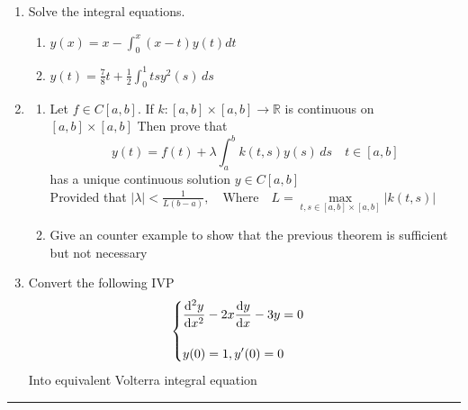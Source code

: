 \documentclass[]{article}
\begin{document}
\begin{enumerate}
    \item Solve the integral equations.
          \vspace*{.2cm}
          \begin{enumerate}
              \item $\displaystyle  y(x)=x-\int_{0}^{x} (x-t) y(t)dt $
              \vspace*{.1cm}
              \item  $\displaystyle y(t)=\frac{7}{8}t+\frac{1}{2} \int_0^1 ts y^2(s) \,ds$
          \end{enumerate}
          \vspace*{.4cm}
    \item

          \begin{enumerate}
              \item Let $\displaystyle f \in C[a,b]$. If $k:[a,b]\times[a,b] \rightarrow \mathbb{R}$ is continuous on $[a,b]\times[a,b]$ Then prove that
                    \[
                        y(t) = f(t) + \lambda \int_a^b k(t,s) y(s) \,ds \quad t\in[a,b]
                    \]
                    has a unique continuous solution $y\in C[a,b]$\\
                    Provided that
                    \(
                        \displaystyle |\lambda|< \frac{1}{L(b-a)} ,\quad \text{Where}\quad L= \max\limits_{t,s\in [a,b]\times[a,b]} |k(t,s)|
                    \)
                    \vspace*{.1cm}
              \item Give an counter example to show that the previous theorem is sufficient but not necessary
          \end{enumerate}
          \vspace*{.4cm}
    \item Convert the following IVP\\
          \[
            \begin{cases}
                \displaystyle \dv[2]{y}{x} -2x \dv{y}{x} -3y =0 \\\\
                \displaystyle y(0) =1 , y'(0)=0                 \\
            \end{cases}  
          \]
          Into equivalent Volterra integral equation
\end{enumerate}
\vspace*{\fill}
\hrule
\end{document}

